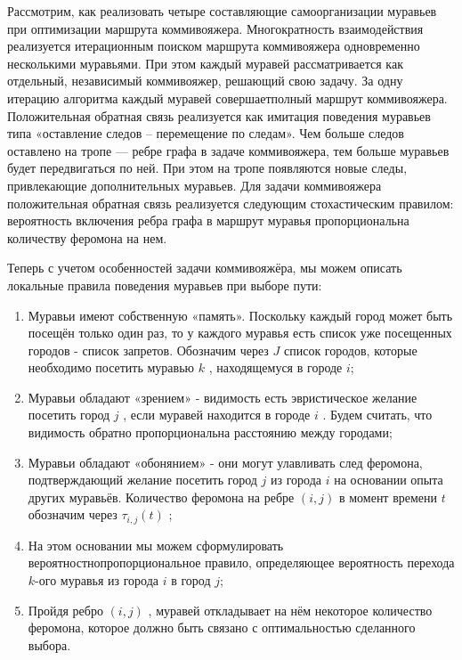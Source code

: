 \documentclass[a4paper,12pt]{report}
\begin{document}
   			Рассмотрим, как реализовать четыре составляющие самоорганизации муравьев при оптимизации маршрута коммивояжера. 
   			Многократность взаимодействия реализуется итерационным поиском маршрута коммивояжера одновременно несколькими муравьями. 
   			При этом каждый муравей рассматривается как отдельный, независимый коммивояжер, решающий свою задачу. 
   			За одну итерацию алгоритма каждый муравей совершаетполный маршрут коммивояжера. 
   			Положительная обратная связь реализуется как имитация поведения муравьев типа «оставление следов – перемещение по следам». 
   			Чем больше следов оставлено на тропе — ребре графа в задаче коммивояжера, тем больше муравьев будет передвигаться по ней. 
   			При этом на тропе появляются новые следы, привлекающие дополнительных муравьев. 
   			Для задачи коммивояжера положительная обратная связь реализуется следующим стохастическим правилом: вероятность включения ребра графа в маршрут муравья пропорциональна количеству феромона на нем.
   			
   			\vspace{0.5cm}
   			Теперь с учетом особенностей задачи коммивояжёра, мы можем описать локальные правила поведения муравьев при выборе пути:\
   			
   			\begin{enumerate}
   			\item Муравьи имеют собственную «память». Поскольку каждый город может быть посещён только один раз, то у каждого муравья есть список уже посещенных городов - список запретов. Обозначим через $J$ список городов, которые необходимо посетить муравью $k$ , находящемуся в городе $i$;
   			
   			\item Муравьи обладают «зрением» - видимость есть эвристическое желание посетить город $j$ , если муравей находится в городе $i$ . Будем считать, что видимость обратно пропорциональна расстоянию между городами; 
   			
   			\item Муравьи обладают «обонянием» - они могут улавливать след феромона, подтверждающий желание посетить город $j$ из города $i$ на основании опыта других муравьёв. Количество феромона на ребре $(i,j)$ в момент времени $t$ обозначим через  $\tau _{i,j} (t)$ ;
   			
   			\item На этом основании мы можем сформулировать вероятностнопропорциональное правило, определяющее вероятность перехода $k$-ого муравья из города $i$  в город $j$;
   			
   			\item Пройдя ребро $(i,j)$ , муравей откладывает на нём некоторое количество феромона, которое должно быть связано с оптимальностью сделанного выбора.
   			\end{enumerate}
   			
\end{document}
